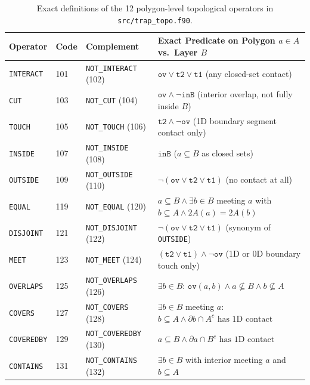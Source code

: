 \begin{table}[htbp]
\centering
\caption{Exact definitions of the 12 polygon-level topological operators in \texttt{src/trap\_topo.f90}.}
\label{tab:de9im_ref}
\small
\begin{tabular}{@{}llll@{}}
\toprule
\textbf{Operator} & \textbf{Code} & \textbf{Complement} & \textbf{Exact Predicate on Polygon $a \in A$ vs.\ Layer $B$} \\
\midrule
\texttt{INTERACT} & 101 & \texttt{NOT\_INTERACT} (102) & $\texttt{ov} \lor \texttt{t2} \lor \texttt{t1}$ (any closed-set contact) \\
\texttt{CUT} & 103 & \texttt{NOT\_CUT} (104) & $\texttt{ov} \land \neg\texttt{inB}$ (interior overlap, not fully inside $B$) \\
\texttt{TOUCH} & 105 & \texttt{NOT\_TOUCH} (106) & $\texttt{t2} \land \neg\texttt{ov}$ (1D boundary segment contact only) \\
\texttt{INSIDE} & 107 & \texttt{NOT\_INSIDE} (108) & $\texttt{inB}$ ($a \subseteq B$ as closed sets) \\
\texttt{OUTSIDE} & 109 & \texttt{NOT\_OUTSIDE} (110) & $\neg(\texttt{ov} \lor \texttt{t2} \lor \texttt{t1})$ (no contact at all) \\
\texttt{EQUAL} & 119 & \texttt{NOT\_EQUAL} (120) & $a \subseteq B \land \exists b \in B$ meeting $a$ with $b \subseteq A \land 2A(a)=2A(b)$ \\
\texttt{DISJOINT} & 121 & \texttt{NOT\_DISJOINT} (122) & $\neg(\texttt{ov} \lor \texttt{t2} \lor \texttt{t1})$ (synonym of \texttt{OUTSIDE}) \\
\texttt{MEET} & 123 & \texttt{NOT\_MEET} (124) & $(\texttt{t2} \lor \texttt{t1}) \land \neg\texttt{ov}$ (1D or 0D boundary touch only) \\
\texttt{OVERLAPS} & 125 & \texttt{NOT\_OVERLAPS} (126) & $\exists b \in B$: $\texttt{ov}(a,b) \land a \not\subseteq B \land b \not\subseteq A$ \\
\texttt{COVERS} & 127 & \texttt{NOT\_COVERS} (128) & $\exists b \in B$ meeting $a$: $b \subseteq A \land \partial b \cap A^c \text{ has 1D contact}$ \\
\texttt{COVEREDBY} & 129 & \texttt{NOT\_COVEREDBY} (130) & $a \subseteq B \land \partial a \cap B^c \text{ has 1D contact}$ \\
\texttt{CONTAINS} & 131 & \texttt{NOT\_CONTAINS} (132) & $\exists b \in B$ with interior meeting $a$ and $b \subseteq A$ \\
\bottomrule
\end{tabular}
\end{table}

